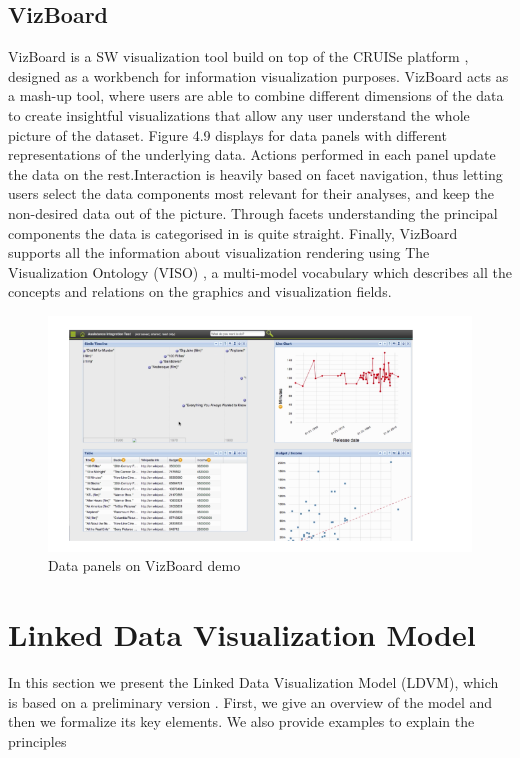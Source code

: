 \documentclass[a4paper,12pt,oneside]{report}
\begin{document}
{{{\subsection{VizBoard}
{VizBoard  is a SW visualization tool build on top of the CRUISe platform , designed as a workbench for information visualization purposes. VizBoard acts as a mash-up tool, where users are able to combine different dimensions of the data to create
insightful visualizations that allow any user understand the whole picture of the dataset. Figure 4.9 displays for data panels with different representations of the underlying data. Actions performed in each panel update the
data on the rest.Interaction is heavily based on facet navigation, thus letting users select the data components most relevant for their analyses, and keep the non-desired data out of the picture. Through facets understanding the principal
components the data is categorised in is quite straight. Finally, VizBoard supports all the information about visualization rendering using The Visualization Ontology (VISO) , a multi-model vocabulary which describes all the concepts and relations on the graphics
and visualization fields.
\begin{figure}[h!]
\centering
\includegraphics[width=1\textwidth]{Capture17}
\caption{Data panels on VizBoard demo}
\end{figure}
}
\section{Linked Data Visualization Model}
{In this section we present the Linked Data Visualization Model (LDVM), which is based on a preliminary version . First, we give an overview of the model and then we formalize its key elements. We also provide examples to explain the principles}
}}}
\end{document}
